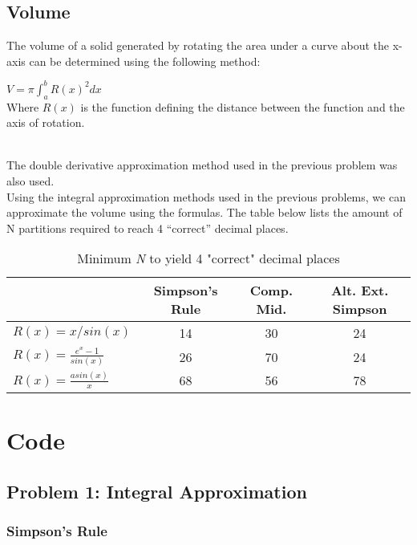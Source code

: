 \documentclass[a4paper12pt,titlepage]{article}
\begin{document}
    \subsection{Volume}
        The volume of a solid generated by rotating the area under a curve about the x-axis can be determined using the following method:
        \begin{center}
            $V = \pi \int_{a}^{b} R(x)^2 dx$
            \\
            Where $R(x)$ is the function defining the distance between the function and the axis of rotation.
        \end{center}
        \\ The double derivative approximation method used in the previous problem was also used. \\[5pt]
        Using the integral approximation methods used in the previous problems, we can approximate the volume using the formulas. The table below lists the amount of N partitions required to reach 4 “correct” decimal places. 
        \begin{table}[h!]
          \begin{center}
            \caption{Minimum \textit{N} to yield 4 "correct" decimal places}
            \label{tab:table3}
            \begin{tabular}{|l|c|c|c|}
              \toprule
              \textbf{} & \textbf{Simpson's Rule} & \textbf{Comp. Mid.} & \textbf{Alt. Ext. Simpson}\\
              \hline
              $R(x) = x/sin(x)$ & 14 & 30 & 24\\
              \hline
              $R(x) = \frac{e^x-1}{sin(x)}$ & 26 & 70 & 24\\
              \hline
              $R(x) = \frac{asin(x)}{x}$ & 68 & 56 & 78\\
              \hline
            \end{tabular}
          \end{center}
        \end{table}
\clearpage
\section{Code}
    \subsection{Problem 1: Integral Approximation}
        \subsubsection{Simpson's Rule}
        
    \clearpage
\end{document}
